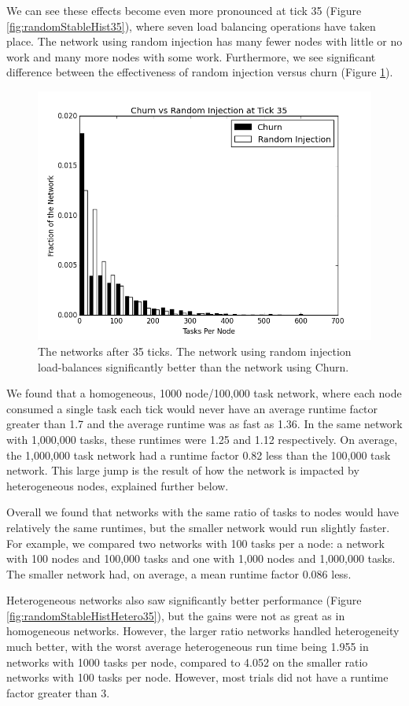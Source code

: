\documentclass[11pt,conference]{IEEEtran}
\begin{document}
{	We can see these effects become even more pronounced at tick 35 (Figure \ref{fig:randomStableHist35}), where seven load balancing operations have taken place.
	The network using random injection has many fewer nodes with little or no work and many more nodes with some work.
	Furthermore, we see significant difference between the effectiveness of random injection versus churn (Figure \ref{fig:churnInjectionHist35}).
	
	\begin{figure}
		\centering
		\includegraphics[width=0.7\linewidth]{figs/churnInjectionHist35}
		\caption[Churn vs Random Injection after 35 ticks.]{The networks after 35 ticks.  The network using random injection load-balances significantly better than the network using Churn.}
		\label{fig:churnInjectionHist35}
	\end{figure}
	
	We found that a homogeneous, 1000 node/100,000 task network, where each node consumed a single task each tick would never have an average runtime factor greater than 1.7 and the average runtime was as fast as 1.36.
	In the same network with 1,000,000 tasks, these runtimes were 1.25 and 1.12 respectively.
	On average, the 1,000,000 task network had a runtime factor 0.82 less than the 100,000 task network.
	This large jump is the result of how the network is impacted by heterogeneous nodes, explained further below.
	
	Overall we found that networks with the same ratio of tasks to nodes would have relatively the same runtimes, but the smaller network would run slightly faster.
	For example, we compared two networks with 100 tasks per a node: a network with 100 nodes and 100,000 tasks and one with 1,000 nodes and 1,000,000 tasks.
	The smaller network had, on average, a mean runtime factor 0.086 less.
	
	Heterogeneous networks also saw significantly better performance (Figure \ref{fig:randomStableHistHetero35}), but the gains were not as great as in homogeneous networks.
	However, the larger ratio networks handled heterogeneity much better, with the worst average heterogeneous run time being 1.955 in networks with 1000 tasks per node, compared to 4.052 on the smaller ratio networks with 100 tasks per node.
	However, most trials did not have a runtime factor greater than 3.
	
}
\end{document}
